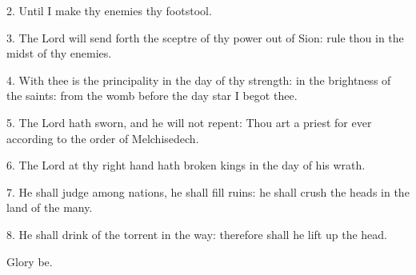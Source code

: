 2. Until I make thy enemies thy footstool.
 
 3. The Lord will send forth the sceptre of thy power out of Sion: rule thou in the midst of thy enemies.
 
 4. With thee is the principality in the day of thy strength: in the brightness of the saints:
 from the womb before the day star I begot thee.
 
 5. The Lord hath sworn, and he will not repent: Thou art a priest for ever according to the order of Melchisedech.
 
 6. The Lord at thy right hand hath broken kings in the day of his wrath.

7. He shall judge among nations, he shall fill ruins: he shall crush the heads in the land of the many.

8. He shall drink of the torrent in the way: therefore shall he lift up the head. 

Glory be.